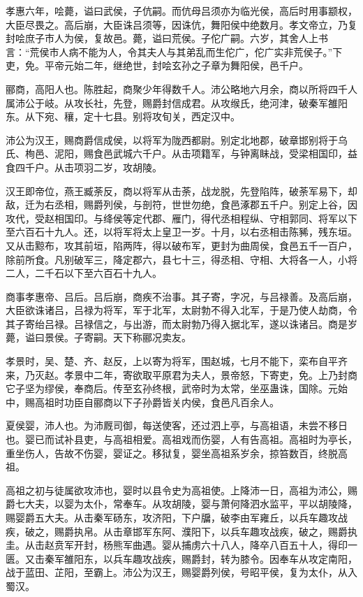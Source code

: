 \documentclass[]{article}
\begin{document}
孝惠六年，哙薨，谥曰武侯，子伉嗣。而伉母吕须亦为临光侯，高后时用事颛权，大臣尽畏之。高后崩，大臣诛吕须等，因诛伉，舞阳侯中绝数月。孝文帝立，乃复封哙庶子市人为侯，复故邑。薨，谥曰荒侯。子佗广嗣。六岁，其舍人上书言：``荒侯市人病不能为人，令其夫人与其弟乱而生佗广，佗广实非荒侯子。''下吏，免。平帝元始二年，继绝世，封哙玄孙之子章为舞阳侯，邑千户。

郦商，高阳人也。陈胜起，商聚少年得数千人。沛公略地六月余，商以所将四千人属沛公于岐。从攻长社，先登，赐爵封信成君。从攻缑氏，绝河津，破秦军雒阳东。从下宛、穰，定十七县。别将攻旬关，西定汉中。

沛公为汉王，赐商爵信成侯，以将军为陇西都尉。别定北地郡，破章邯别将于乌氏、栒邑、泥阳，赐食邑武城六千户。从击项籍军，与钟离眛战，受梁相国印，益食四千户。从击项羽二岁，攻胡陵。

汉王即帝位，燕王臧荼反，商以将军从击荼，战龙脱，先登陷阵，破荼军易下，却敌，迁为右丞相，赐爵列侯，与剖符，世世勿绝，食邑涿郡五千户。别定上谷，因攻代，受赵相国印。与绛侯等定代郡、雁门，得代丞相程纵、守相郭同、将军以下至六百石十九人。还，以将军将太上皇卫一岁。十月，以右丞相击陈豨，残东垣。又从击黥布，攻其前垣，陷两阵，得以破布军，更封为曲周侯，食邑五千一百户，除前所食。凡别破军三，降定郡六，县七十三，得丞相、守相、大将各一人，小将二人，二千石以下至六百石十九人。

商事孝惠帝、吕后。吕后崩，商疾不治事。其子寄，字况，与吕禄善。及高后崩，大臣欲诛诸吕，吕禄为将军，军于北军，太尉勃不得入北军，于是乃使人劫商，令其子寄绐吕禄。吕禄信之，与出游，而太尉勃乃得入据北军，遂以诛诸吕。商是岁薨，谥曰景侯。子寄嗣。天下称郦况卖友。

孝景时，吴、楚、齐、赵反，上以寄为将军，围赵城，七月不能下，栾布自平齐来，乃灭赵。孝景中二年，寄欲取平原君为夫人，景帝怒，下寄吏，免。上乃封商它子坚为缪侯，奉商后。传至玄孙终根，武帝时为太常，坐巫蛊诛，国除。元始中，赐高祖时功臣自郦商以下子孙爵皆关内侯，食邑凡百余人。

夏侯婴，沛人也。为沛厩司御，每送使客，还过泗上亭，与高祖语，未尝不移日也。婴已而试补县吏，与高祖相爱。高祖戏而伤婴，人有告高祖。高祖时为亭长，重坐伤人，告故不伤婴，婴证之。移狱复，婴坐高祖系岁余，掠笞数百，终脱高祖。

高祖之初与徒属欲攻沛也，婴时以县令史为高祖使。上降沛一日，高祖为沛公，赐爵七大夫，以婴为太仆，常奉车。从攻胡陵，婴与萧何降泗水监平，平以胡陵降，赐婴爵五大夫。从击秦军砀东，攻济阳，下户牖，破李由军雍丘，以兵车趣攻战疾，破之，赐爵执帛。从击章邯军东阿、濮阳下，以兵车趣攻战疾，破之，赐爵执圭。从击赵贲军开封，杨熊军曲遇。婴从捕虏六十八人，降卒八百五十人，得印一匮。又击秦军雒阳东，以兵车趣攻战疾，赐爵封，转为膝令。因奉车从攻定南阳，战于蓝田、芷阳，至霸上。沛公为汉王，赐婴爵列侯，号昭平侯，复为太仆，从入蜀汉。
\end{document}
